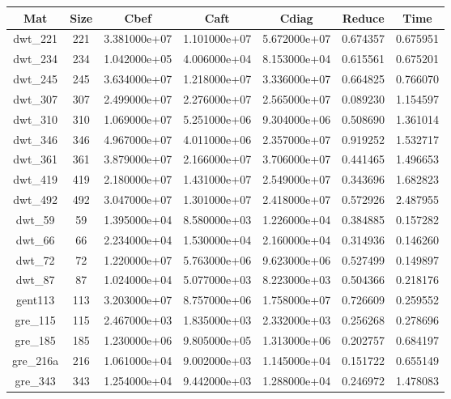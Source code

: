 \begin{table}[h]
  \begin{tabular}{c|c|c|c|cc|c}
    \hline
    Mat & Size & Cbef & Caft & Cdiag & Reduce & Time\\
    \hline
    dwt\_221 & 221 & 3.381000e+07 & 1.101000e+07 & 5.672000e+07 & 0.674357 &
    0.675951\\
    dwt\_234 & 234 & 1.042000e+05 & 4.006000e+04 & 8.153000e+04 & 0.615561 &
    0.675201\\
    dwt\_245 & 245 & 3.634000e+07 & 1.218000e+07 & 3.336000e+07 & 0.664825 &
    0.766070\\
    dwt\_307 & 307 & 2.499000e+07 & 2.276000e+07 & 2.565000e+07 & 0.089230 &
    1.154597\\
    dwt\_310 & 310 & 1.069000e+07 & 5.251000e+06 & 9.304000e+06 & 0.508690 &
    1.361014\\
    dwt\_346 & 346 & 4.967000e+07 & 4.011000e+06 & 2.357000e+07 & 0.919252 &
    1.532717\\
    dwt\_361 & 361 & 3.879000e+07 & 2.166000e+07 & 3.706000e+07 & 0.441465 &
    1.496653\\
    dwt\_419 & 419 & 2.180000e+07 & 1.431000e+07 & 2.549000e+07 & 0.343696 &
    1.682823\\
    dwt\_492 & 492 & 3.047000e+07 & 1.301000e+07 & 2.418000e+07 & 0.572926 &
    2.487955\\
    dwt\_59 & 59 & 1.395000e+04 & 8.580000e+03 & 1.226000e+04 & 0.384885 &
    0.157282\\
    dwt\_66 & 66 & 2.234000e+04 & 1.530000e+04 & 2.160000e+04 & 0.314936 &
    0.146260\\
    dwt\_72 & 72 & 1.220000e+07 & 5.763000e+06 & 9.623000e+06 & 0.527499 &
    0.149897\\
    dwt\_87 & 87 & 1.024000e+04 & 5.077000e+03 & 8.223000e+03 & 0.504366 &
    0.218176\\
    gent113 & 113 & 3.203000e+07 & 8.757000e+06 & 1.758000e+07 & 0.726609 &
    0.259552\\
    gre\_115 & 115 & 2.467000e+03 & 1.835000e+03 & 2.332000e+03 & 0.256268 &
    0.278696\\
    gre\_185 & 185 & 1.230000e+06 & 9.805000e+05 & 1.313000e+06 & 0.202757 &
    0.684197\\
    gre\_216a & 216 & 1.061000e+04 & 9.002000e+03 & 1.145000e+04 & 0.151722 &
    0.655149\\
    gre\_343 & 343 & 1.254000e+04 & 9.442000e+03 & 1.288000e+04 & 0.246972 &
    1.478083\\

\end{tabular}
\end{table}
